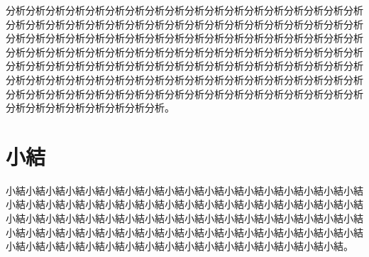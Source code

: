 分析分析分析分析分析分析分析分析分析分析分析分析分析分析分析分析分析分析分析分析分析分析分析分析分析分析分析分析分析分析分析分析分析分析分析分析分析分析分析分析分析分析分析分析分析分析分析分析分析分析分析分析分析分析分析分析分析分析分析分析分析分析分析分析分析分析分析分析分析分析分析分析分析分析分析分析分析分析分析分析分析分析分析分析分析分析分析分析分析分析分析分析分析分析分析分析分析分析分析分析分析分析分析分析分析分析分析分析分析分析分析分析分析分析分析分析分析分析分析分析分析分析分析分析分析分析分析分析分析分析分析分析分析分析。




\newpage

\section{小結}
小結小結小結小結小結小結小結小結小結小結小結小結小結小結小結小結小結小結小結小結小結小結小結小結小結小結小結小結小結小結小結小結小結小結小結小結小結小結小結小結小結小結小結小結小結小結小結小結小結小結小結小結小結小結小結小結小結小結小結小結小結小結小結小結小結小結小結小結小結小結小結小結小結小結小結小結小結小結小結小結小結小結小結小結小結小結小結小結小結。